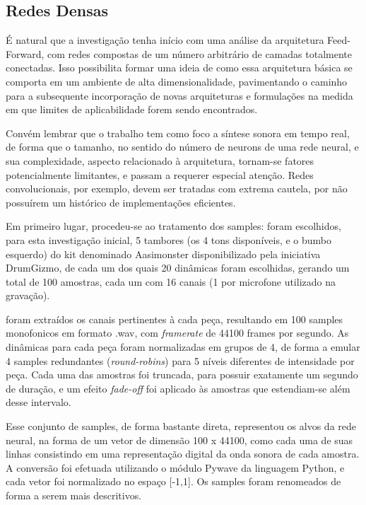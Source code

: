 \documentclass[]{article}
\begin{document}
\hypertarget{redes-densas-1}{%
\subsection{Redes Densas}\label{redes-densas-1}}

É natural que a investigação tenha início com uma análise da arquitetura
Feed-Forward, com redes compostas de um número arbitrário de camadas
totalmente conectadas. Isso possibilita formar uma ideia de como essa
arquitetura básica se comporta em um ambiente de alta dimensionalidade,
pavimentando o caminho para a subsequente incorporação de novas
arquiteturas e formulações na medida em que limites de aplicabilidade
forem sendo encontrados.

Convém lembrar que o trabalho tem como foco a síntese sonora em tempo
real, de forma que o tamanho, no sentido do número de neurons de uma
rede neural, e sua complexidade, aspecto relacionado à arquitetura,
tornam-se fatores potencialmente limitantes, e passam a requerer
especial atenção. Redes convolucionais, por exemplo, devem ser tratadas
com extrema cautela, por não possuírem um histórico de implementações
eficientes.

Em primeiro lugar, procedeu-se ao tratamento dos samples: foram
escolhidos, para esta investigação inicial, 5 tambores (os 4 tons
disponíveis, e o bumbo esquerdo) do kit denominado Aasimonster
disponibilizado pela iniciativa DrumGizmo, de cada um dos quais 20
dinâmicas foram escolhidas, gerando um total de 100 amostras, cada um
com 16 canais (1 por microfone utilizado na gravação).

foram extraídos os canais pertinentes à cada peça, resultando em 100
samples monofonicos em formato .wav, com \emph{framerate} de 44100
frames por segundo. As dinâmicas para cada peça foram normalizadas em
grupos de 4, de forma a emular 4 samples redundantes
(\emph{round-robins}) para 5 níveis diferentes de intensidade por peça.
Cada uma das amostras foi truncada, para possuir exatamente um segundo
de duração, e um efeito \emph{fade-off} foi aplicado às amostras que
estendiam-se além desse intervalo.

Esse conjunto de samples, de forma bastante direta, representou os alvos
da rede neural, na forma de um vetor de dimensão 100 x 44100, como cada
uma de suas linhas consistindo em uma representação digital da onda
sonora de cada amostra. A conversão foi efetuada utilizando o módulo
Pywave da linguagem Python, e cada vetor foi normalizado no espaço
{[}-1,1{]}. Os samples foram renomeados de forma a serem mais
descritivos.
\end{document}

